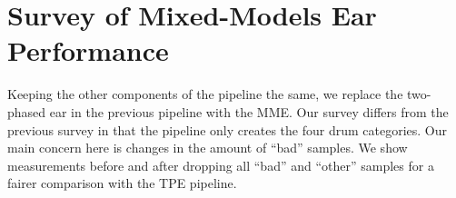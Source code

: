 \documentclass[runningheads,a4paper]{llncs}
\begin{document}
\section{Survey of Mixed-Models Ear Performance}
 Keeping the other components of the pipeline the same, we replace the two-phased ear in the previous pipeline with the MME. Our survey differs from the previous survey in that the pipeline only creates the four drum categories. Our main concern here is changes in the amount of \enquote{bad} samples. We show measurements before and after dropping all \enquote{bad} and \enquote{other} samples for a fairer comparison with the TPE pipeline.

 \begin{table}[t]
\caption{\label{kappa_table_MME}Table of Fleiss' kappa coefficient to measure the degree of agreement between persons (HvH) and persons and MME. We also measure the agreeability scores after dropping bad samples if both or either persons assigned the sample as such. We also measure agree-ability when all samples deemed \enquote{bad} or \enquote{other} by either person are removed.}
\end{table}
\end{document}
